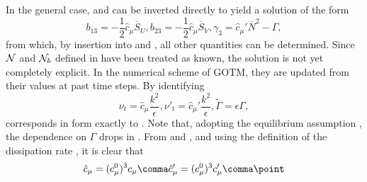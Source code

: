 In the general case,  and  can be
inverted directly to yield a solution of the form
\begin{equation}
\label{b13}
  b_{13}   = - \dfrac{1}{2} \hat{c}_\mu \overline{S}_U \comma
  b_{23}   = - \dfrac{1}{2} \hat{c}_\mu \overline{S}_V \comma
 \gamma_3  = \hat{c}_\mu' \overline{N}^2 - \Gamma
 \comma
\end{equation}
from which, by insertion into  and ,
all other quantities can be determined. Since ${\cal N}$ and ${\cal
N}_b$ defined in  have been treated as known, the solution
is not yet completely explicit. In the numerical scheme of GOTM, they
are updated from their values at past time steps. By identifying 
\begin{equation}
  \label{nuke}
  \nu_t           = \hat{c}_\mu   \dfrac{k^2}{\epsilon} \comma
  \nu'_t          = \hat{c}_\mu'  \dfrac{k^2}{\epsilon} \comma
  \tilde{\Gamma}  = \epsilon \Gamma
  \comma
\end{equation}
 corresponds in form exactly to . Note that, adopting the 
equilibrium assumption , the dependence on $\Gamma$
drops in . From  and , and using the definition
of the dissipation rate , it is clear that 
\begin{equation}
  \label{cmuConversion}
  \hat{c}_\mu = (c^0_\mu)^3  c_\mu \comma
  \hat{c}_\mu' = (c^0_\mu)^3 c'_\mu \comma
  \point
\end{equation}


